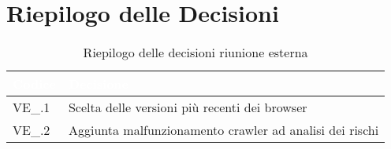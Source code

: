 \section{Riepilogo delle Decisioni}


\begin{table}[!htbp]
\renewcommand{\arraystretch}{1.5}
\begin{tabular}{m{}<{\centering}  m{}<{\centering}}
\rowcolor{darkblue} \textcolor{white}{\textbf{Codice}} & \textcolor{white}{\textbf{Decisione}} \\
\hline
VE\_\D{}.1 &  Scelta delle versioni più recenti dei browser\\
VE\_\D{}.2 &  Aggiunta malfunzionamento crawler ad analisi dei rischi\\

\end{tabular}
\caption{Riepilogo delle decisioni riunione esterna \D{}}
\end{table}